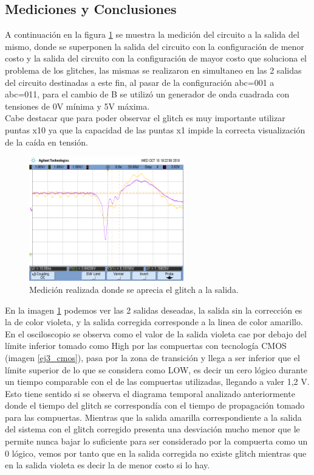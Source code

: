\subsection{Mediciones y Conclusiones}
\noindent
A continuación en la figura \ref{ej3_medicion} se muestra la medición del circuito a la salida del mismo, donde se superponen la salida del circuito con la configuración de menor costo y la salida del circuito con la configuración de mayor costo que soluciona el problema de los glitches, las mismas se realizaron en simultaneo en las 2 salidas del circuito destinadas a este fin, al pasar de la configuración abc=001 a abc=011, para el cambio de B se utilizó un generador de onda cuadrada con tensiones de 0V mínima y 5V máxima.\\ Cabe destacar que para poder observar el glitch es muy importante utilizar puntas x10 ya que la capacidad de las puntas x1 impide la correcta visualización de la caída en tensión.
%
\begin{figure}[H]
    \centering
        \centering
        \includegraphics[width=0.6\textwidth]{figs/Ej3/x10_se_ve_glitchesito_ojo_limit_oscil.png} %
         \caption{Medición realizada donde se aprecia el glitch a la salida.}
         \label{ej3_medicion}
\end{figure}
%
\noindent
En la imagen \ref{ej3_medicion} podemos ver las 2 salidas deseadas, la salida sin la corrección es la de color violeta, y la salida corregida corresponde a la linea de color amarillo.\\
En el osciloscopio se observa como el valor de la salida violeta cae por debajo del límite inferior tomado como High por las compuertas con tecnología CMOS (imagen \ref{ej3_cmos}), pasa por la zona de transición y llega a ser inferior que el límite superior de lo que se considera como LOW, es decir un cero lógico durante un tiempo comparable con el de las compuertas utilizadas, llegando a valer 1,2 V. Esto tiene sentido si se observa el diagrama temporal analizado anteriormente donde el tiempo del glitch se correspondía con el tiempo de propagación tomado para las compuertas. Mientras que la salida amarilla correspondiente a la salida del sistema con el glitch corregido presenta una desviación mucho menor que le permite nunca bajar lo suficiente para ser considerado por la compuerta como un 0 lógico, vemos por tanto que en la salida corregida no existe glitch mientras que en la salida violeta es decir la de menor costo si lo hay.
